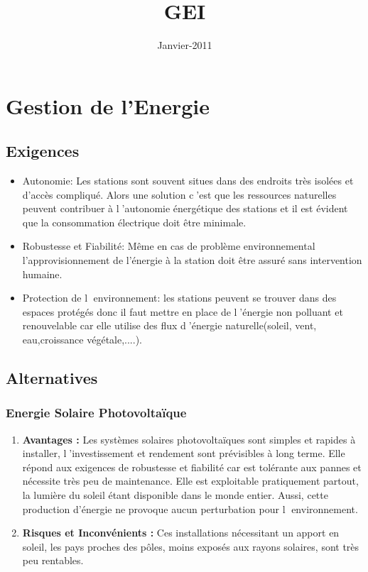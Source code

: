 \documentclass [a4paper] {report}
\begin{document}
\title{GEI}
\date{Janvier-2011}
\maketitle

\chapter{Gestion de l'Energie}
\section{Exigences}
\begin{itemize}

\item Autonomie: Les stations sont souvent situes dans des endroits tr\`es isol\'{e}es et d'acc\`es compliqu\'e. Alors une solution c'est que les ressources naturelles peuvent contribuer  à l'autonomie \'energ\'{e}tique des stations et il est \'{e}vident que la consommation \'{e}lectrique doit \^etre minimale.

\smallskip \item Robustesse et Fiabilit\'{e}: Même en cas de probl\`eme environnemental l'approvisionnement de l'\'{e}nergie \`a la station doit \^etre assur\'{e} sans intervention humaine.

\smallskip \item Protection de l environnement: les stations peuvent se trouver dans des espaces prot\'{e}g\'{e}s donc il faut mettre en place de l'\'{e}nergie non polluant et renouvelable car elle utilise des flux d'\'{e}nergie naturelle(soleil, vent, eau,croissance v\'{e}g\'{e}tale,....).
\end{itemize}

\section{Alternatives}
\subsection{Energie Solaire Photovolta\"ique}
\begin{enumerate}
\item \textbf{Avantages :}
Les syst\`emes solaires photovoltaïques sont simples et rapides à installer, l'investissement  et rendement sont pr\'{e}visibles à long terme.
Elle r\'{e}pond aux exigences de robustesse et fiabilit\'{e} car est tolérante aux pannes et n\'{e}cessite tr\`es peu de maintenance. 
Elle est exploitable pratiquement partout, la lumi\`ere du soleil \'{e}tant disponible dans le monde entier. 
Aussi, cette production d'\'{e}nergie ne provoque aucun perturbation pour l environnement.

\item \textbf{Risques et Inconv\'enients :}
Ces installations n\'{e}cessitant un apport en soleil, les pays proches des pôles, moins expos\'{e}s aux rayons solaires, sont tr\`es peu rentables.
\end{enumerate}
\end{document}
